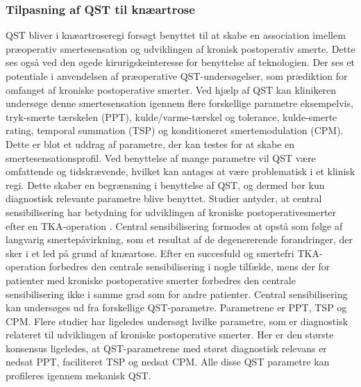 \subsubsection{Tilpasning af QST til knæartrose}
QST bliver i  knæartroseregi forsøgt benyttet til at skabe en association imellem præoperativ smertesensation og udviklingen af kronisk postoperativ smerte. Dette ses også ved den øgede kirurigskeinteresse for benyttelse af teknologien. Der ses et potentiale i anvendelsen af præoperative QST-undersøgelser, som prædiktion for omfanget af kroniske postoperative smerter. \citep{Wylde2013} Ved hjælp af QST kan klinikeren undersøge denne smertesensation igennem flere forskellige parametre eksempelvis, tryk-smerte tærskelen (PPT), kulde/varme-tærskel og tolerance, kulde-smerte rating, temporal summation (TSP) og konditioneret smertemodulation (CPM). \citep{Cornelius2015} Dette er blot et uddrag af parametre, der kan testes for at skabe en smertesensationsprofil. Ved benyttelse af mange parametre vil QST være omfattende og tidskrævende, hvilket kan antages at være problematisk i et klinisk regi. Dette skaber en begrænsning i benyttelse af QST, og dermed bør kun diagnostisk relevante parametre blive benyttet. \citep{Nielsen2009} Studier antyder, at central sensibilisering har betydning for udviklingen af kroniske postoperativesmerter efter en TKA-operation \citep{Suokas2012}. Central sensibilisering formodes at opstå som følge af langvarig smertepåvirkning, som et resultat af de degenererende forandringer, der sker i et led på grund af knæartose. \citep{Arendt-Nielsen2015b} Efter en succesfuld og smertefri TKA-operation forbedres den centrale sensibilisering i nogle tilfælde, mens der for patienter med kroniske postoperative smerter forbedres den centrale sensibilisering ikke i samme grad som for andre patienter. \citep{Arendt-Nielsen2015b} Central sensibilisering kan undersøges ud fra forskellige QST-parametre. Parametrene er PPT, TSP og CPM. \citep{Arendt-Nielsen2015b} Flere studier har ligeledes undersøgt hvilke parametre, som er diagnostisk relateret til udviklingen af kroniske postoperative smerter. Her er den største konsensus ligeledes, at QST-parametrene med størst diagnostisk relevans er nedsat PPT, faciliteret TSP og nedsat CPM. Alle disse QST parametre kan profileres igennem mekanisk QST. \citep{Petersen2015} \citep{Petersen2016} \citep{Wylde2015b} \\
